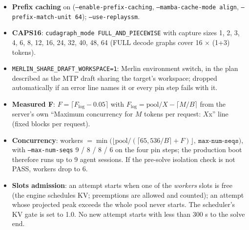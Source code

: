 \begin{itemize}[leftmargin=*,itemsep=1pt]
\item \textbf{Prefix caching} on (\texttt{--enable-prefix-caching}, \texttt{--mamba-cache-mode align}, \texttt{--prefix-match-unit 64}); \texttt{--use-replayssm}.
\item \textbf{CAPS16}: \texttt{cudagraph\_mode FULL\_AND\_PIECEWISE} with capture sizes 1, 2, 3, 4, 6, 8, 12, 16, 24, 32, 40, 48, 64 (FULL decode graphs cover 16 $\times$ (1+3) tokens).
\item \texttt{MERLIN\_SHARE\_DRAFT\_WORKSPACE=1}: Merlin environment switch, in the plan described as the MTP draft sharing the target's workspace; dropped automatically if an error line names it or every pin step fails with it.
\item \textbf{Measured F}: $F = \lceil F_{\log} - 0.05\rceil$ with $F_{\log} = \text{pool}/X - \lceil M/B\rceil$ from the server's own ``Maximum concurrency for $M$ tokens per request: $X$x'' line (fixed blocks per request).
\item \textbf{Concurrency}: workers $=\min\big(\lfloor \text{pool}/(\lceil 65{,}536/B\rceil + F)\rfloor,\ \texttt{max-num-seqs}\big)$, with \texttt{--max-num-seqs} 9 / 8 / 8 / 6 on the four pin steps; the production boot therefore runs up to 9 agent sessions. If the pre-solve isolation check is not PASS, workers drop to 6.
\item \textbf{Slots admission}: an attempt starts when one of the \emph{workers} slots is free (the engine schedules KV; preemptions are allowed and counted); an attempt whose projected peak exceeds the whole pool never starts. The scheduler's KV gate is set to 1.0. No new attempt starts with less than 300 s to the solve end.
\end{itemize}

